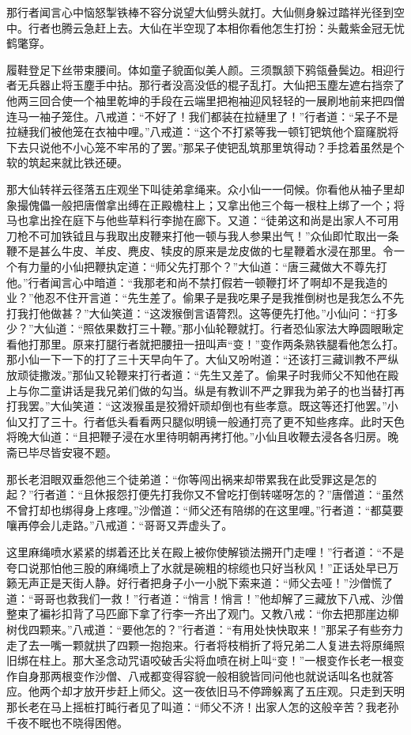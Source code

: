 \documentclass[12pt,UTF8]{ctexbook}
\begin{document}
那行者闻言心中恼怒掣铁棒不容分说望大仙劈头就打。大仙侧身躲过踏祥光径到空中。行者也腾云急赶上去。大仙在半空现了本相你看他怎生打扮：头戴紫金冠无忧鹤氅穿。

履鞋登足下丝带束腰间。体如童子貌面似美人颜。三须飘颔下鸦瓴叠鬓边。相迎行者无兵器止将玉塵手中拈。那行者没高没低的棍子乱打。大仙把玉塵左遮右挡奈了他两三回合使一个袖里乾坤的手段在云端里把袍袖迎风轻轻的一展刷地前来把四僧连马一袖子笼住。八戒道：“不好了！我们都装在拉縺里了！”行者道：“呆子不是拉縺我们被他笼在衣袖中哩。”八戒道：“这个不打紧等我一顿钉钯筑他个窟窿脱将下去只说他不小心笼不牢吊的了罢。”那呆子使钯乱筑那里筑得动？手捻着虽然是个软的筑起来就比铁还硬。

那大仙转祥云径落五庄观坐下叫徒弟拿绳来。众小仙一一伺候。你看他从袖子里却象撮傀儡一般把唐僧拿出缚在正殿檐柱上；又拿出他三个每一根柱上绑了一个；将马也拿出拴在庭下与他些草料行李抛在廊下。又道：“徒弟这和尚是出家人不可用刀枪不可加铁钺且与我取出皮鞭来打他一顿与我人参果出气！”众仙即忙取出一条鞭不是甚么牛皮、羊皮、麂皮、犊皮的原来是龙皮做的七星鞭着水浸在那里。令一个有力量的小仙把鞭执定道：“师父先打那个？”大仙道：“唐三藏做大不尊先打他。”行者闻言心中暗道：“我那老和尚不禁打假若一顿鞭打坏了啊却不是我造的业？”他忍不住开言道：“先生差了。偷果子是我吃果子是我推倒树也是我怎么不先打我打他做甚？”大仙笑道：“这泼猴倒言语膂烈。这等便先打他。”小仙问：“打多少？”大仙道：“照依果数打三十鞭。”那小仙轮鞭就打。行者恐仙家法大睁圆眼瞅定看他打那里。原来打腿行者就把腰扭一扭叫声“变！”变作两条熟铁腿看他怎么打。那小仙一下一下的打了三十天早向午了。大仙又吩咐道：“还该打三藏训教不严纵放顽徒撒泼。”那仙又轮鞭来打行者道：“先生又差了。偷果子时我师父不知他在殿上与你二童讲话是我兄弟们做的勾当。纵是有教训不严之罪我为弟子的也当替打再打我罢。”大仙笑道：“这泼猴虽是狡猾奸顽却倒也有些孝意。既这等还打他罢。”小仙又打了三十。行者低头看看两只腿似明镜一般通打亮了更不知些疼痒。此时天色将晚大仙道：“且把鞭子浸在水里待明朝再拷打他。”小仙且收鞭去浸各各归房。晚斋已毕尽皆安寝不题。

那长老泪眼双垂怨他三个徒弟道：“你等闯出祸来却带累我在此受罪这是怎的起？”行者道：“且休报怨打便先打我你又不曾吃打倒转嗟呀怎的？”唐僧道：“虽然不曾打却也绑得身上疼哩。”沙僧道：“师父还有陪绑的在这里哩。”行者道：“都莫要嚷再停会儿走路。”八戒道：“哥哥又弄虚头了。

这里麻绳喷水紧紧的绑着还比关在殿上被你使解锁法搠开门走哩！”行者道：“不是夸口说那怕他三股的麻绳喷上了水就是碗粗的棕缆也只好当秋风！”正话处早已万籁无声正是天街人静。好行者把身子小一小脱下索来道：“师父去哑！”沙僧慌了道：“哥哥也救我们一救！”行者道：“悄言！悄言！”他却解了三藏放下八戒、沙僧整束了褊衫扣背了马匹廊下拿了行李一齐出了观门。又教八戒：“你去把那崖边柳树伐四颗来。”八戒道：“要他怎的？”行者道：“有用处快快取来！”那呆子有些夯力走了去一嘴一颗就拱了四颗一抱抱来。行者将枝梢折了将兄弟二人复进去将原绳照旧绑在柱上。那大圣念动咒语咬破舌尖将血喷在树上叫“变！”一根变作长老一根变作自身那两根变作沙僧、八戒都变得容貌一般相貌皆同问他也就说话叫名也就答应。他两个却才放开步赶上师父。这一夜依旧马不停蹄躲离了五庄观。只走到天明那长老在马上摇桩打盹行者见了叫道：“师父不济！出家人怎的这般辛苦？我老孙千夜不眠也不晓得困倦。
\end{document}
